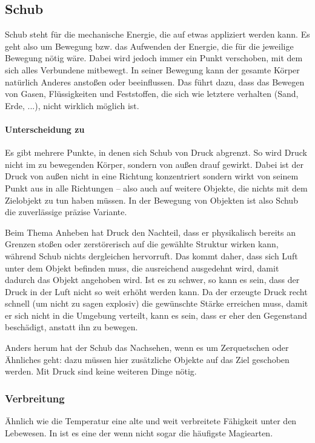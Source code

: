 \subsection{Schub}\label{magie:schub}
Schub steht für die mechanische Energie, die auf etwas appliziert werden kann.
Es geht also um Bewegung bzw. das Aufwenden der Energie, die für die jeweilige Bewegung nötig wäre.
Dabei wird jedoch immer ein Punkt verschoben, mit dem sich alles Verbundene mitbewegt.
In seiner Bewegung kann der gesamte Körper natürlich Anderes anstoßen oder beeinflussen.
Das führt dazu, dass das Bewegen von Gasen, Flüssigkeiten und Feststoffen, die sich wie letztere verhalten (Sand, Erde, ...), nicht wirklich möglich ist.

\paragraph{Unterscheidung zu } 
Es gibt mehrere Punkte, in denen sich Schub von Druck abgrenzt. 
So wird Druck nicht im zu bewegenden Körper, sondern von außen drauf gewirkt.
Dabei ist der Druck von außen nicht in eine Richtung konzentriert sondern wirkt von seinem Punkt aus in alle Richtungen -- also auch auf weitere Objekte, die nichts mit dem Zielobjekt zu tun haben müssen.
In der Bewegung von Objekten ist also Schub die zuverlässige präzise Variante.

Beim Thema Anheben hat Druck den Nachteil, dass er physikalisch bereits an Grenzen stoßen oder zerstörerisch auf die gewählte Struktur wirken kann, während Schub nichts dergleichen hervorruft.
Das kommt daher, dass sich Luft unter dem Objekt befinden muss, die ausreichend ausgedehnt wird, damit dadurch das Objekt angehoben wird.
Ist es zu schwer, so kann es sein, dass der Druck in der Luft nicht so weit erhöht werden kann.
Da der erzeugte Druck recht schnell (um nicht zu sagen explosiv) die gewünschte Stärke erreichen muss, damit er sich nicht in die Umgebung verteilt, kann es sein, dass er eher den Gegenstand beschädigt, anstatt ihn zu bewegen.

Anders herum hat der Schub das Nachsehen, wenn es um Zerquetschen oder Ähnliches geht: dazu müssen hier zusätzliche Objekte auf das Ziel geschoben werden.
Mit Druck sind keine weiteren Dinge nötig.

\subsubsection{Verbreitung}
Ähnlich wie die Temperatur eine alte und weit verbreitete Fähigkeit unter den Lebewesen.
In  ist es eine der wenn nicht sogar die häufigste Magiearten.

